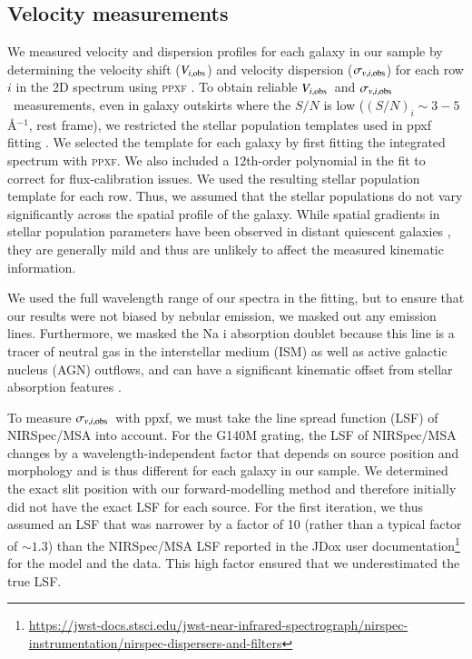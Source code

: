 \documentclass{aa}
\newcommand{\vobsi}{$V_{i,{\rm obs}}$}
\newcommand{\sigmaobsi}{$\sigma_{v,i,{\rm obs}}$}
\begin{document}
\subsection{Velocity measurements}\label{sec:vel_measurements}
We measured velocity and dispersion profiles for each galaxy in our sample by determining the velocity shift (\vobsi) and velocity dispersion (\sigmaobsi) for each row $i$ in the 2D spectrum using \textsc{ppxf} \citep{MCappellari2004, MCappellari2017,MCappellari2023}. To obtain reliable \vobsi\ and \sigmaobsi\ measurements, even in galaxy outskirts where the $S/N$ is low ($(S/N)_i \sim 3-5$\,\AA$^{-1}$, rest frame), we restricted the stellar population templates used in {\sc ppxf} fitting \citep{JvandeSande2017, FdEugenio2024}. We selected the template for each galaxy by first fitting the integrated spectrum with \textsc{ppxf}. We also included a 12th-order polynomial in the fit to correct for flux-calibration issues. We used the resulting stellar population template for each row. Thus, we assumed that the stellar populations do not vary significantly across the spatial profile of the galaxy. While spatial gradients in stellar population parameters have been observed in distant quiescent galaxies \citep[e.g.][]{Jafariyazani_2020,Cheng_2024}, they are generally mild and thus are unlikely to affect the measured kinematic information.

We used the full wavelength range of our spectra in the fitting, but to ensure that our results were not biased by nebular emission, we masked out any emission lines. Furthermore, we masked the Na {\sc i} absorption doublet because this line is a tracer of neutral gas in the interstellar medium (ISM) as well as active galactic nucleus (AGN) outflows, and can have a significant kinematic offset from stellar absorption features \citep[e.g.][]{SBelli2024, RDavies2024}.

To measure \sigmaobsi\ with {\sc ppxf}, we must take the line spread function (LSF) of NIRSpec/MSA into account. For the G140M grating, the LSF of NIRSpec/MSA changes by a wavelength-independent factor that depends on source position and morphology \citep{AdeGraaff2024_kinematics, MSlob2024} and is thus different for each galaxy in our sample. We determined the exact slit position with our forward-modelling method and therefore initially did not have the exact LSF for each source. For the first iteration, we thus assumed an LSF that was narrower by a factor of 10 (rather than a typical factor of $\sim 1.3$) than the NIRSpec/MSA LSF reported in the JDox user documentation\footnote{\url{https://jwst-docs.stsci.edu/jwst-near-infrared-spectrograph/nirspec-instrumentation/nirspec-dispersers-and-filters}} for the model and the data. This high factor ensured that we underestimated the true LSF.
\end{document}
